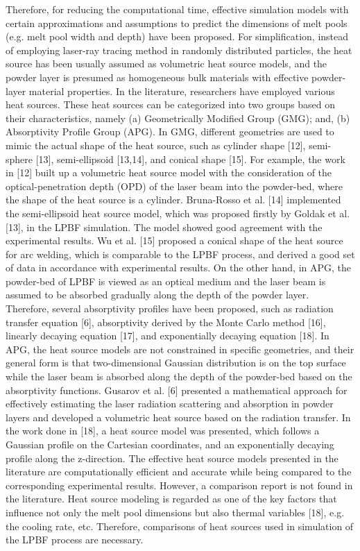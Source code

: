 \documentclass[10pt]{article}
\begin{document}
Therefore, for reducing the computational time, effective simulation models with certain approximations and assumptions to predict the dimensions of melt pools (e.g. melt pool width and depth) have been proposed. For simplification, instead of employing laser-ray tracing method in randomly distributed particles, the heat source has been usually assumed as volumetric heat source models, and the powder layer is presumed as homogeneous bulk materials with effective powder-layer material properties. In the literature, researchers have employed various heat sources. These heat sources can be categorized into two groups based on their characteristics, namely (a) Geometrically Modified Group (GMG); and, (b) Absorptivity Profile Group (APG). In GMG, different geometries are used to mimic the actual shape of the heat source, such as cylinder shape [12], semi-sphere [13], semi-ellipsoid [13,14], and conical shape [15]. For example, the work in [12] built up a volumetric heat source model with the consideration of the optical-penetration depth (OPD) of the laser beam into the powder-bed, where the shape of the heat source is a cylinder. Bruna-Rosso et al. [14] implemented the semi-ellipsoid heat source model, which was proposed firstly by Goldak et al. [13], in the LPBF simulation. The model showed good agreement with the experimental results. Wu et al. [15] proposed a conical shape of the heat source for arc welding, which is comparable to the LPBF process, and derived a good set of data in accordance with experimental results. On the other hand, in APG, the powder-bed of LPBF is viewed as an optical medium and the laser beam is assumed to be absorbed gradually along the depth of the powder layer. Therefore, several absorptivity profiles have been proposed, such as radiation transfer equation [6], absorptivity derived by the Monte Carlo method [16], linearly decaying equation [17], and exponentially decaying equation [18]. In APG, the heat source models are not constrained in specific geometries, and their general form is that two-dimensional Gaussian distribution is on the top surface while the laser beam is absorbed along the depth of the powder-bed based on the absorptivity functions. Gusarov et al. [6] presented a mathematical approach for effectively estimating the laser radiation scattering and absorption in powder layers and developed a volumetric heat source based on the radiation transfer. In the work done in [18], a heat source model was presented, which follows a Gaussian profile on the Cartesian coordinates, and an exponentially decaying profile along the z-direction. The effective heat source models presented in the literature are computationally efficient and accurate while being compared to the corresponding experimental results. However, a comparison report is not found in the literature. Heat source modeling is regarded as one of the key factors that influence not only the melt pool dimensions but also thermal variables [18], e.g. the cooling rate, etc. Therefore, comparisons of heat sources used in simulation of the LPBF process are necessary.
\end{document}
